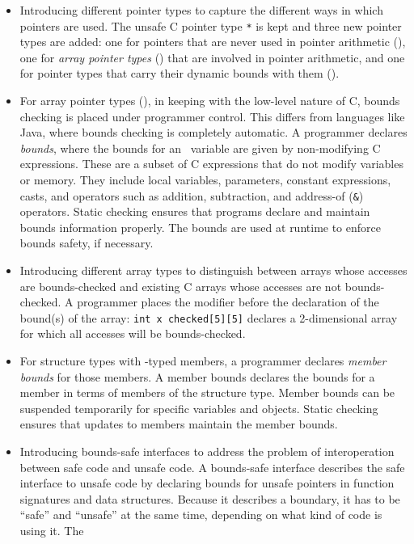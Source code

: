 \begin{itemize}
\item
  Introducing different pointer types to capture the different ways in
  which pointers are used. The unsafe C pointer type \texttt{*} is kept
  and three new pointer types are added: one for pointers that are never
  used in pointer arithmetic (\ptr), one for \emph{array pointer
  types} (\arrayptr) that are involved in pointer arithmetic,
  and one for pointer types that carry their dynamic bounds with them
  (\arrayview ).
\item
  For array pointer types (\arrayptr), in keeping with the low-level
  nature of C,  bounds checking is placed under programmer control. 
  This differs from languages like
  Java, where bounds checking is completely automatic. A programmer
  declares \emph{bounds}, where the bounds for an \arrayptr\
  variable are given by non-modifying C expressions. These are a subset
  of C expressions that do not modify variables or memory. They include
  local variables, parameters, constant expressions, casts, and
  operators such as addition, subtraction, and address-of (\texttt{\&})
  operators. Static checking ensures that programs declare and maintain
  bounds information properly. The bounds are used at runtime to enforce
  bounds safety, if necessary.
\item
  Introducing different array types to distinguish between arrays whose
  accesses are bounds-checked and existing C arrays whose accesses are
  not bounds-checked. A programmer places the modifier 
  before the declaration of the bound(s) of the array: \texttt{int x
  checked[5][5]} declares a 2-dimensional array for which all
  accesses will be bounds-checked.
\item
  For structure types with \arrayptr -typed members, a
  programmer declares \emph{member bounds} for those members. A member
  bounds declares the bounds for a member in terms of members of the
  structure type. Member bounds can be suspended temporarily for
  specific variables and objects. Static checking ensures that updates
  to members maintain the member bounds.
\item
  Introducing bounds-safe interfaces to address the problem of
  interoperation between safe code and unsafe code. A bounds-safe
  interface describes the safe interface to unsafe code by declaring
  bounds for unsafe pointers in function signatures and data structures.
  Because it describes a boundary, it has to be ``safe'' and ``unsafe''
  at the same time, depending on what kind of code is using it. The

\end{itemize}
